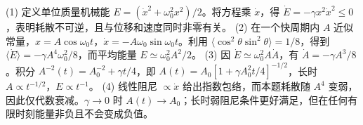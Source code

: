 (1) 定义单位质量机械能 \(E=(\dot x^2+\omega_0^2x^2)/2\)。将方程乘 \(\dot x\)，得 \(\dot E=-\gamma x^2\dot x^2\le0\)，表明耗散不可逆，且与位移和速度同时非零有关。
(2) 在一个快周期内 \(A\) 近似常量，\(x=A\cos\omega_0t\)，\(\dot x=-A\omega_0\sin\omega_0t\)。利用 \(\langle\cos^2\theta\sin^2\theta\rangle=1/8\)，得到 \(\langle\dot E\rangle=-\gamma A^4\omega_0^2/8\)，而平均能量 \(E\simeq\omega_0^2A^2/2\)。
(3) 因 \(\dot E\simeq\omega_0^2A\dot A\)，有 \(\dot A=-\gamma A^3/8\)。积分 \(A^{-2}(t)=A_0^{-2}+\gamma t/4\)，即 \(A(t)=A_0[1+\gamma A_0^2t/4]^{-1/2}\)，长时 \(A\propto t^{-1/2}\)，\(E\propto t^{-1}\)。
(4) 线性阻尼 \(\propto\dot x\) 给出指数包络，而本题耗散随 \(A^4\) 变弱，因此仅代数衰减。\(\gamma\to0\) 时 \(A(t)\to A_0\)；长时弱阻尼条件更好满足，但在任何有限时刻能量非负且不会变成负值。
